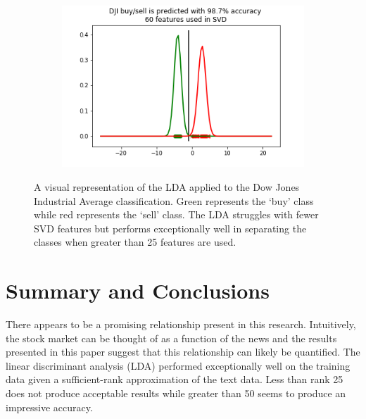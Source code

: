 \documentclass{article}
\begin{document}
\begin{figure}
\begin{subfigure}{.5\textwidth}
    \caption{ }
    \label{fig:cropVar}
\end{subfigure}%
\begin{subfigure}{.5\textwidth}
    \centering
    \includegraphics[width=1.0\linewidth]{Figures/LDA_Accuracy_DJI_60.png}
    \caption{ }
    \label{fig:uncropVar}
\end{subfigure}


\caption{A visual representation of the LDA applied to the Dow Jones Industrial Average classification.  Green represents the `buy' class while red represents the `sell' class.  The LDA struggles with fewer SVD features but performs exceptionally well in separating the classes when greater than 25 features are used.}
\label{fig:DJIprog}
\end{figure}



\section{Summary and Conclusions}

There appears to be a promising relationship present in this research.  Intuitively, the stock market can be thought of as a function of the news and the results presented in this paper suggest that this relationship can likely be quantified.  The linear discriminant analysis (LDA) performed exceptionally well on the training data given a sufficient-rank approximation of the text data.  Less than rank 25 does not produce acceptable results while greater than 50 seems to produce an impressive accuracy.
\end{document}
